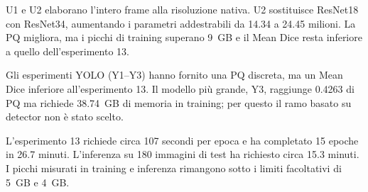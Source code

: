 U1 e U2 elaborano l'intero frame alla risoluzione nativa. U2 sostituisce ResNet18 con
ResNet34, aumentando i parametri addestrabili da 14.34 a 24.45 milioni. La PQ migliora,
ma i picchi di training superano 9~GB e il Mean Dice resta inferiore a quello
dell'esperimento 13.

Gli esperimenti YOLO (Y1--Y3) hanno fornito una PQ discreta, ma un Mean Dice inferiore
all'esperimento 13. Il modello più grande, Y3, raggiunge 0.4263 di PQ ma richiede 38.74~GB
di memoria in training; per questo il ramo basato su detector non è stato scelto.

L'esperimento 13 richiede circa 107 secondi per epoca e ha completato 15 epoche in 26.7
minuti. L'inferenza su 180 immagini di test ha richiesto circa 15.3 minuti. I picchi
misurati in training e inferenza rimangono sotto i limiti facoltativi di 5~GB e 4~GB.
